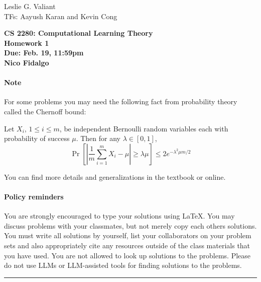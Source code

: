 \documentclass[11pt]{article}
\DeclareMathOperator{\1}{\mathbbm{1}}
\begin{document}
\begin{flushright}
			Leslie G. Valiant \\
			TFs: Aayush Karan and Kevin Cong
\end{flushright}

\begin{center}
\textbf{CS 2280: Computational Learning Theory} \\
\textbf{Homework 1}\\
\textbf{Due: Feb. 19, 11:59pm}\\
\textbf{Nico Fidalgo}
\end{center}

\paragraph{Note} For some problems you may need the following fact from probability theory called the Chernoff bound:

\begin{theorem} Let $X_i$, $1 \leq i \leq m$, be independent Bernoulli random variables each with probability of success $\mu$. Then for any $\lambda \in [0,1]$, 
	\[ \Pr \left[ \left| \frac{1}{m} \sum_{i=1}^m X_i - \mu\right| \geq \lambda \mu
	\right] \leq 2 e^{-\lambda^2 \mu m /2} \]
\end{theorem}

You can find more details and generalizations in the textbook or online.

\paragraph{Policy reminders} You are strongly encouraged to type your solutions using
\LaTeX. You may discuss problems with your classmates, but not merely copy each others solutions. You must write all solutions by yourself, list your collaborators on your problem sets and also appropriately cite any resources outside of the class materials that you have used. You are not allowed to look up solutions to the problems. Please do not use LLMs or LLM-assisted tools for finding solutions to the problems.

\rule{\linewidth}{0.4pt}
\end{document}
